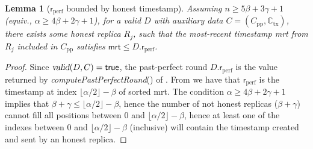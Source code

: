 \documentclass[pdflatex,sn-mathphys-num]{sn-jnl}%
\theoremstyle{thmstyleone}%
\theoremstyle{thmstyletwo}%
\theoremstyle{thmstylethree}%
\newtheorem{lemma}{Lemma}
\newcommand{\true}{\mathsf{true}}
\newcommand{\op}[1]{\textsl{#1}}
\newcommand{\opMinPossibleTsForNewTx}[1]{\op{computePastPerfectRound}(#1)\xspace}
\newcommand{\opValid}[1]{\op{valid}(#1)\xspace}
\newcommand{\operand}[1]{\textsf{#1}}
\newcommand{\tx}{\operand{tx}\xspace}
\newcommand{\round}{\operand{r}\xspace}
\newcommand{\rmax}{\ensuremath{\round_\text{max}}\xspace}
\newcommand{\rperf}{\ensuremath{\round_\text{perf}}\xspace}
\newcommand{\rep}{\ensuremath{R}\xspace}
\newcommand{\mrt}{\operand{mrt}\xspace}
\newcommand{\tsp}{\operand{ts}\xspace}
\newcommand{\txcerti}[1]{\ensuremath{C_{\text{tx}_{#1}}}\xspace}
\newcommand{\alltxcert}{\ensuremath{\mathbb{C}_\text{tx}}\xspace}
\newcommand{\ppcert}{\ensuremath{C_\text{pp}}\xspace}
\newcommand{\cert}{\ensuremath{C}\xspace}
\newcommand{\Pod}{\ensuremath{D}\xspace}
\let\oldalpha\alpha
\renewcommand{\alpha}{\ensuremath{\oldalpha}\xspace}
\let\oldbeta\beta
\renewcommand{\beta}{\ensuremath{\oldbeta}\xspace}
\let\oldgamma\gamma
\renewcommand{\gamma}{\ensuremath{\oldgamma}\xspace}
\begin{document}
\begin{appendices}
\begin{lemma}[\rperf bounded by honest timestamp]\label{lem:rperf-value-of-honest}
	Assuming $n \geq 5 \beta + 3 \gamma + 1$ (equiv., $\alpha \geq 4\beta + 2 \gamma + 1$),
	for a valid \Pod with auxiliary data $\cert = (\ppcert, \alltxcert)$,
	there exists some honest replica $\rep_j$, such that the most-recent timestamp \mrt from $\rep_j$ included in $\ppcert$ satisfies $\mrt \leq \Pod.\rperf$.
\end{lemma}
\begin{proof}
	Since $\opValid{\Pod, \cert} = \true$, the past-perfect round $\Pod.\rperf$ is the value returned by \opMinPossibleTsForNewTx{} of .
	From  we have that \rperf is the timestamp at index $\lfloor \alpha / 2 \rfloor - \beta$ of sorted \mrt.
	The condition $\alpha \geq 4\beta + 2 \gamma + 1$ implies that $\beta + \gamma \leq \lfloor \alpha / 2 \rfloor - \beta$,
	hence the number of not honest replicas ($\beta + \gamma$) cannot fill all positions between $0$ and $\lfloor \alpha / 2 \rfloor - \beta$,
	hence at least one of the indexes between $0$ and $\lfloor \alpha / 2 \rfloor - \beta$ (inclusive) will
	contain the timestamp created and sent by an honest replica.
\end{proof}

\end{appendices}
\end{document}
